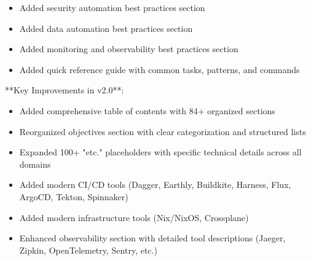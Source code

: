 \documentclass[11pt,a4paper]{article}
\begin{document}
\begin{itemize}
\item Added security automation best practices section
\end{itemize}

\begin{itemize}
\item Added data automation best practices section
\end{itemize}

\begin{itemize}
\item Added monitoring and observability best practices section
\end{itemize}

\begin{itemize}
\item Added quick reference guide with common tasks, patterns, and commands
\end{itemize}

**Key Improvements in v2.0**:

\begin{itemize}
\item Added comprehensive table of contents with 84+ organized sections
\end{itemize}

\begin{itemize}
\item Reorganized objectives section with clear categorization and structured lists
\end{itemize}

\begin{itemize}
\item Expanded 100+ "etc." placeholders with specific technical details across all domains
\end{itemize}

\begin{itemize}
\item Added modern CI/CD tools (Dagger, Earthly, Buildkite, Harness, Flux, ArgoCD, Tekton, Spinnaker)
\end{itemize}

\begin{itemize}
\item Added modern infrastructure tools (Nix/NixOS, Crossplane)
\end{itemize}

\begin{itemize}
\item Enhanced observability section with detailed tool descriptions (Jaeger, Zipkin, OpenTelemetry, Sentry, etc.)
\end{itemize}
\end{document}
